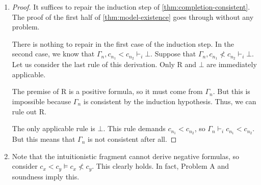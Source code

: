 \documentclass[a4paper]{article}
\begin{document}
\begin{enumerate}
  \begin{theorem}[Completeness]
    If $\Gamma \vDash \varphi$ then $\Gamma \vdash \varphi$.
  \end{theorem}
  \begin{proof}
    Suppose that $\Gamma \nvdash \varphi$ and that $\Gamma \vDash \varphi$.
    The first assumption implies that $\Gamma$ is consistent, so by \cref{thm:model-existence}, $\Gamma$ has a model $(X,R)$ which also satisfies $\lnot\varphi$.
    But this is a contradiction because $(X,R)$ must satisfy its opposite $\varphi$ by the second assumption.
  \end{proof}
\item
  \begin{proof}
    It suffices to repair the induction step of \cref{thm:completion-consistent}.
    The proof of the first half of \cref{thm:model-existence} goes through without any problem.

    There is nothing to repair in the first case of the induction step.
    In the second case, we know that $\Gamma_{n},c_{n_1} < c_{n_2} \vdash_i \bot$.
    Suppose that $\Gamma_{n},c_{n_1} \nless c_{n_2} \vdash_i \bot$.
    Let us consider the last rule of this derivation.
    Only R and $\bot$ are immediately applicable.

    The premise of R is a positive formula, so it must come from $\Gamma_{n}$.
    But this is impossible because $\Gamma_{n}$ is consistent by the induction hypothesis.
    Thus, we can rule out R.

    The only applicable rule is $\bot$.
    This rule demands $c_{n_1} < c_{n_2}$, so $\Gamma_{n} \vdash_{i} c_{n_1} < c_{n_2}$.
    But this means that $\Gamma_{n}$ is not consistent after all.
  \end{proof}
\item Note that the intuitionistic fragment cannot derive negative formulas, so consider $c_{x} < c_{y} \vDash c_{x} \nless c_{y}$.
  This clearly holds.
  In fact, Problem A and soundness imply this.
\end{enumerate}

\end{document}
